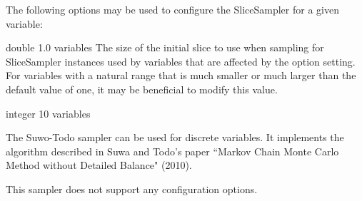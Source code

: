 The following options may be used to configure the SliceSampler for a given variable:


{double}
{1.0}
{variables}
{The size of the initial slice to use when sampling for SliceSampler instances used by variables that are affected by the option setting. For variables with a natural range that is much smaller or much larger than the default value of one, it may be beneficial to modify this value.}


{integer}
{10}
{variables}
{}

\label{sec:SuwoTodoSampler}

The Suwo-Todo sampler can be used for discrete variables. It implements the algorithm described in Suwa and Todo's paper ``Markov Chain Monte Carlo Method without Detailed Balance" (2010).

This sampler does not support any configuration options.
